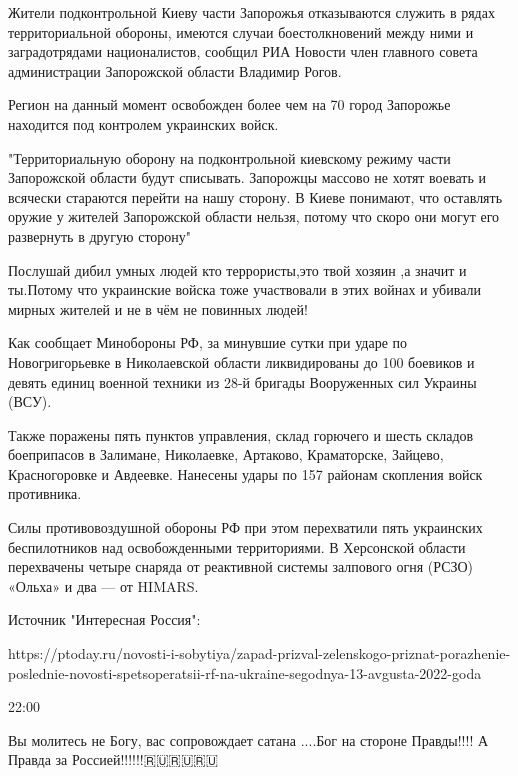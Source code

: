 
Жители подконтрольной Киеву части Запорожья отказываются служить в рядах
территориальной обороны, имеются случаи боестолкновений между ними и
заградотрядами националистов, сообщил РИА Новости член главного совета
администрации Запорожской области Владимир Рогов.

Регион на данный момент освобожден более чем на 70%
город Запорожье находится под контролем украинских войск.

"Территориальную оборону на подконтрольной киевскому режиму части Запорожской
области будут списывать. Запорожцы массово не хотят воевать и всячески
стараются перейти на нашу сторону. В Киеве понимают, что оставлять оружие у
жителей Запорожской области нельзя, потому что скоро они могут его развернуть в
другую сторону"


Послушай дибил умных людей кто террористы,это твой хозяин ,а значит и ты.Потому
что украинские войска тоже участвовали в этих войнах и убивали мирных жителей и
не в чём не повинных людей!


Как сообщает Минобороны РФ, за минувшие сутки при ударе по Новогригорьевке в
Николаевской области ликвидированы до 100 боевиков и девять единиц военной
техники из 28-й бригады Вооруженных сил Украины (ВСУ).

Также поражены пять пунктов управления, склад горючего и шесть складов
боеприпасов в Залимане, Николаевке, Артаково, Краматорске, Зайцево,
Красногоровке и Авдеевке. Нанесены удары по 157 районам скопления войск
противника.

Силы противовоздушной обороны РФ при этом перехватили пять украинских
беспилотников над освобожденными территориями. В Херсонской области перехвачены
четыре снаряда от реактивной системы залпового огня (РСЗО) «Ольха» и два — от
HIMARS.

Источник "Интересная Россия": 

https://ptoday.ru/novosti-i-sobytiya/zapad-prizval-zelenskogo-priznat-porazhenie-poslednie-novosti-spetsoperatsii-rf-na-ukraine-segodnya-13-avgusta-2022-goda

22:00

Вы молитесь не Богу, вас сопровождает сатана ....Бог на стороне Правды!!!! А
Правда за Россией!!!!!!🇷🇺🇷🇺🇷🇺


